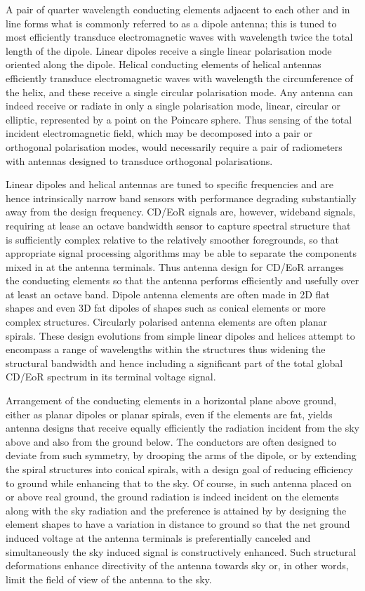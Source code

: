   A pair of quarter wavelength conducting elements adjacent to each other and in line forms what is commonly referred to as a dipole antenna; this is tuned to most efficiently transduce electromagnetic waves with wavelength twice the total length of the dipole.  Linear dipoles receive a single linear polarisation mode oriented along the dipole.  Helical conducting elements of helical antennas efficiently transduce electromagnetic waves with wavelength the circumference of the helix, and these receive a single circular polarisation mode.  Any antenna can indeed receive or radiate in only a single polarisation mode, linear, circular or elliptic, represented by a point on the Poincare sphere.  Thus sensing of the total incident electromagnetic field, which may be decomposed into a pair or orthogonal polarisation modes, would necessarily require a pair of radiometers with antennas designed to transduce orthogonal polarisations.  
  
  Linear dipoles and helical antennas are tuned to specific frequencies and are hence intrinsically narrow band sensors with performance degrading substantially away from the design frequency. CD/EoR signals are, however, wideband signals, requiring at lease an octave bandwidth sensor to capture spectral structure that is sufficiently complex relative to the relatively smoother foregrounds, so that appropriate signal processing algorithms may be able to separate the components mixed in at the antenna terminals.  Thus antenna design for CD/EoR arranges the conducting elements so that the antenna performs efficiently and usefully over at least an octave band.  Dipole antenna elements are often made in 2D flat shapes and even 3D fat dipoles of shapes such as conical elements or more complex structures. Circularly polarised antenna elements are often planar spirals.  These design evolutions from simple linear dipoles and helices attempt to encompass a range of wavelengths within the structures thus widening the structural bandwidth and hence including a significant part of the total global CD/EoR spectrum in its terminal voltage signal.
  
  Arrangement of the conducting elements in a horizontal plane above ground, either as planar dipoles or planar spirals, even if the elements are fat, yields antenna designs that receive equally efficiently the radiation incident from the sky above and also from the ground below. The conductors are often designed to deviate from such symmetry, by drooping the arms of the dipole, or by extending the spiral structures into conical spirals, with a design goal of reducing efficiency to ground while enhancing that to the sky. Of course, in such antenna placed on or above real ground, the ground radiation is indeed incident on the elements along with the sky radiation and the preference is attained by by designing the element shapes to have a variation in distance to ground so that the net ground induced voltage at the antenna terminals is preferentially canceled and simultaneously the sky induced signal is constructively enhanced. Such structural deformations enhance directivity of the antenna towards sky or, in other words, limit the field of view of the antenna to the sky.
  
